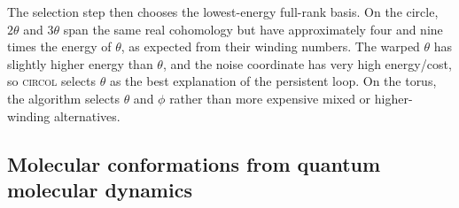 \documentclass[a4paper,11pt, DIV=10]{scrartcl}
\numberwithin{equation}{section}
\theoremstyle{definition}
\theoremstyle{remark}
\begin{document}
The selection step then chooses the lowest-energy full-rank basis.
On the circle, $2\theta$ and $3\theta$ span the same real cohomology but have approximately four and nine times the energy of $\theta$, as expected from their winding numbers.
The warped $\theta$ has slightly higher energy than $\theta$, and the noise coordinate has very high energy/cost, so \textsc{circol} selects $\theta$ as the best explanation of the persistent loop.
On the torus, the algorithm selects $\theta$ and $\phi$ rather than more expensive mixed or higher-winding alternatives.

\subsection{Molecular conformations from quantum molecular dynamics}

\label{sec:molecular-torsion}
\end{document}
